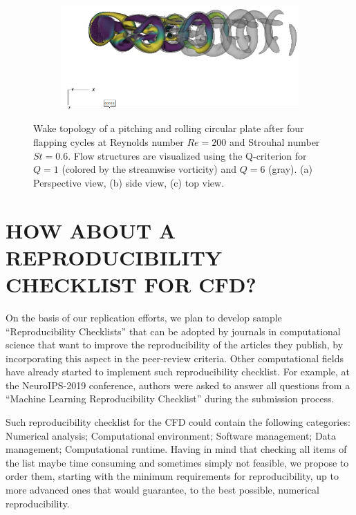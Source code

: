 \documentclass{parcfd}
\begin{document}
\begin{figure}
\begin{minipage}{0.3\textwidth}
        \vspace*{1cm}
        \begin{subfigure}{\linewidth}
            \includegraphics[width=\linewidth]{rollingpitching_top_view.png}
            \caption{}
            \label{fig:rollingpitching:top_view}
        \end{subfigure}
    \end{minipage}
    \caption{Wake topology of a pitching and rolling circular plate after four flapping cycles at Reynolds number $Re = 200$ and Strouhal number $St = 0.6$. Flow structures are visualized using the Q-criterion for $Q = 1$ (colored by the streamwise vorticity) and $Q = 6$ (gray). (a) Perspective view, (b) side view, (c) top view.}
    \label{fig:rollingpitching}
\end{figure}

\section{HOW ABOUT A REPRODUCIBILITY CHECKLIST FOR CFD?}

On the basis of our replication efforts, we plan to develop sample ``Reproducibility Checklists'' that can be adopted by journals in computational science that want to improve the reproducibility of the articles they publish, by incorporating this aspect in the peer-review criteria.
Other computational fields have already started to implement such reproducibility checklist.
For example, at the NeuroIPS-2019 conference, authors were asked to answer all questions from a ``Machine Learning Reproducibility Checklist'' during the submission process.

Such reproducibility checklist for the CFD could contain the following categories: Numerical analysis; Computational environment; Software management; Data management; Computational runtime.
Having in mind that checking all items of the list maybe time consuming and sometimes simply not feasible, we propose to order them, starting with the minimum requirements for reproducibility, up to more advanced ones that would guarantee, to the best possible, numerical reproducibility.
\end{document}
